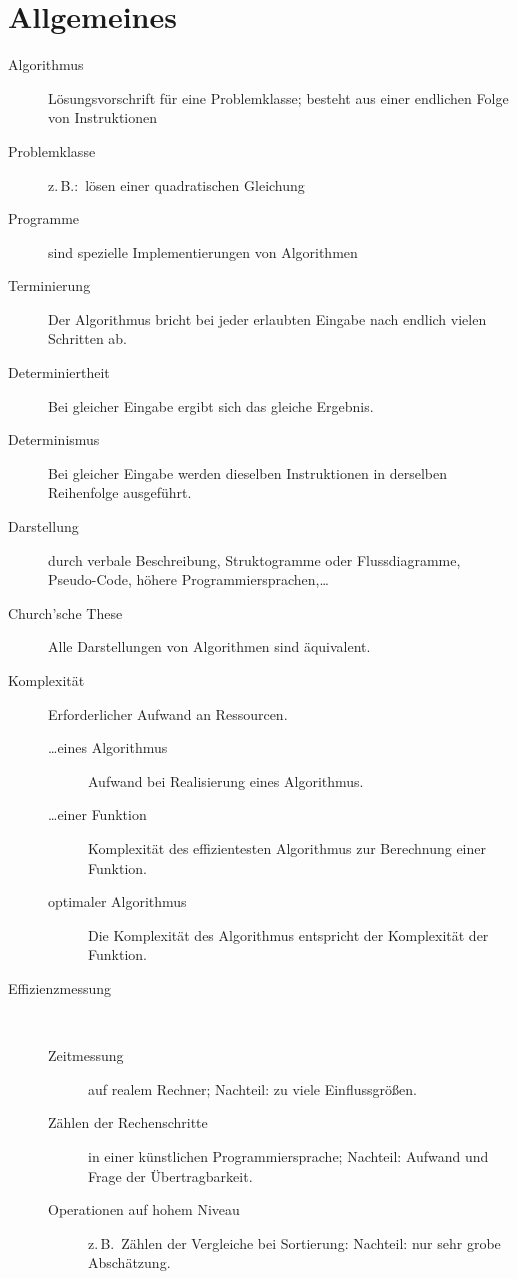 
\chapter{Allgemeines}
\begin{description}
  \item[Algorithmus] Lösungsvorschrift für eine Problemklasse; besteht aus einer endlichen Folge von Instruktionen
  \item[Problemklasse] z.\,B.:~lösen einer quadratischen Gleichung
  \item[Programme] sind spezielle Implementierungen von Algorithmen
  \item[Terminierung] Der Algorithmus bricht bei jeder erlaubten Eingabe nach endlich vielen Schritten ab.
  \item[Determiniertheit] Bei gleicher Eingabe ergibt sich das gleiche Ergebnis.
  \item[Determinismus] Bei gleicher Eingabe werden dieselben Instruktionen in derselben Reihenfolge ausgeführt.
  \item[Darstellung] durch verbale Beschreibung, Struktogramme oder Flussdiagramme, Pseudo-Code, höhere Programmiersprachen,\ldots
  \item[Church'sche These] Alle Darstellungen von Algorithmen sind äquivalent.
  \item[Komplexität] Erforderlicher Aufwand an Ressourcen.
  \begin{description}
    \item[\ldots eines Algorithmus] Aufwand bei Realisierung eines Algorithmus.
    \item[\ldots einer Funktion] Komplexität des effizientesten Algorithmus zur Berechnung einer Funktion.
    \item[optimaler Algorithmus] Die Komplexität des Algorithmus entspricht der Komplexität der Funktion.
  \end{description}
  \item[Effizienzmessung] ~
  \begin{description}
    \item[Zeitmessung] auf realem Rechner; Nachteil: zu viele Einflussgrößen.
    \item[Zählen der Rechenschritte] in einer künstlichen Programmiersprache; Nachteil: Aufwand und Frage der Übertragbarkeit.
    \item[Operationen auf hohem Niveau] z.\,B.~Zählen der Vergleiche bei Sortierung: Nachteil: nur sehr grobe Abschätzung.
  \end{description}
\end{description}

